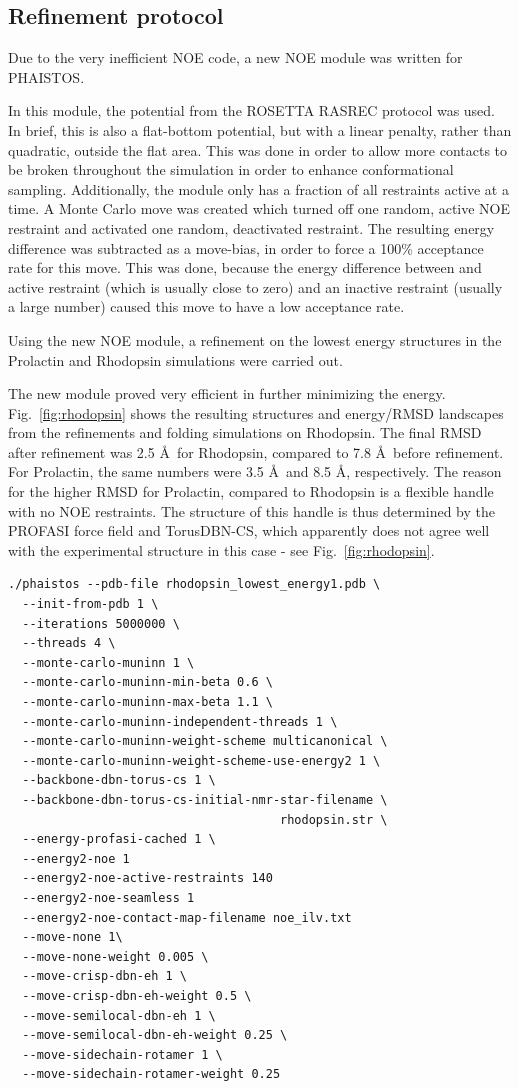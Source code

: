 \subsection{Refinement protocol}

Due to the very inefficient NOE code, a new NOE module was written for PHAISTOS.

In this module, the potential from the ROSETTA RASREC protocol was used.
In brief, this is also a flat-bottom potential, but with a linear penalty, rather than quadratic, outside the flat area.
This was done in order to allow more contacts to be broken throughout the simulation in order to enhance conformational sampling.
Additionally, the module only has a fraction of all restraints active at a time.
A Monte Carlo move was created which turned off one random, active NOE restraint and activated one random, deactivated restraint.
The resulting energy difference was subtracted as a move-bias, in order to force a 100\% acceptance rate for this move.
This was done, because the energy difference between and active restraint (which is usually close to zero) and an inactive restraint (usually a large number) caused this move to have a low acceptance rate.

Using the new NOE module, a refinement on the lowest energy structures in the Prolactin and Rhodopsin simulations were carried out.

The new module proved very efficient in further minimizing the energy.
Fig.~\ref{fig:rhodopsin} shows the resulting structures and energy/RMSD landscapes from the refinements and folding simulations on Rhodopsin.
The final RMSD after refinement was 2.5 \AA~for Rhodopsin, compared to 7.8 \AA~before refinement.
For Prolactin, the same numbers were 3.5 \AA~and 8.5 \AA, respectively.
The reason for the higher RMSD for Prolactin, compared to Rhodopsin is a flexible handle with no NOE restraints.
The structure of this handle is thus determined by the PROFASI force field and TorusDBN-CS, which apparently does not agree well with the experimental structure in this case - see Fig.~\ref{fig:rhodopsin}.

\begin{lstlisting}
./phaistos --pdb-file rhodopsin_lowest_energy1.pdb \
  --init-from-pdb 1 \
  --iterations 5000000 \
  --threads 4 \
  --monte-carlo-muninn 1 \
  --monte-carlo-muninn-min-beta 0.6 \
  --monte-carlo-muninn-max-beta 1.1 \
  --monte-carlo-muninn-independent-threads 1 \
  --monte-carlo-muninn-weight-scheme multicanonical \
  --monte-carlo-muninn-weight-scheme-use-energy2 1 \
  --backbone-dbn-torus-cs 1 \
  --backbone-dbn-torus-cs-initial-nmr-star-filename \
                                      rhodopsin.str \
  --energy-profasi-cached 1 \
  --energy2-noe 1
  --energy2-noe-active-restraints 140
  --energy2-noe-seamless 1
  --energy2-noe-contact-map-filename noe_ilv.txt
  --move-none 1\
  --move-none-weight 0.005 \
  --move-crisp-dbn-eh 1 \
  --move-crisp-dbn-eh-weight 0.5 \
  --move-semilocal-dbn-eh 1 \
  --move-semilocal-dbn-eh-weight 0.25 \
  --move-sidechain-rotamer 1 \
  --move-sidechain-rotamer-weight 0.25
\end{lstlisting}


